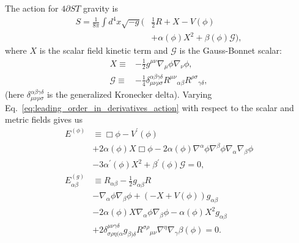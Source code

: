 \documentclass[%
notitlepage,
report,
nofootinbib,
 amsmath,amssymb,
 aps,
]{revtex4-1}
\begin{document}
The action for $4\partial ST$ gravity is
\begin{align}
\label{eq:leading_order_in_derivatives_action}
    S
    =
    \frac{1}{8\pi}
   \int d^4x\sqrt{-g}
   \Big(&
   \frac{1}{2}R
   +
   X
   -
   V\left(\phi\right)
   \nonumber\\
   &
   +
   \alpha\left(\phi\right)X^2
   +	
   \beta\left(\phi\right)\mathcal{G}
   \Big)
    ,
\end{align}
where $X$ is the scalar field kinetic term
and $\mathcal{G}$ is the Gauss-Bonnet scalar:
\begin{subequations}
\begin{align}
   X
   \equiv&
   -
   \frac{1}{2}g^{\mu\nu}\nabla_{\mu}\phi\nabla_{\nu}\phi
   ,\\
   \mathcal{G}
   \equiv&
   -
   \frac{1}{4}
   \delta^{\alpha\beta\gamma\delta}_{\mu\nu\rho\sigma}
   R^{\mu\nu}{}_{\alpha\beta}
   R^{\rho\sigma}{}_{\gamma\delta}
   ,
\end{align}
\end{subequations}
(here $\delta^{\alpha\beta\gamma\delta}_{\mu\nu\rho\sigma}$
is the generalized Kronecker delta).
Varying Eq.~\eqref{eq:leading_order_in_derivatives_action}
with respect to the scalar and metric fields gives us
\begin{align}
\label{eq:eom_edgb_scalar}
   E^{(\phi)}
   &\equiv
   \Box\phi
   -  
   V^{\prime}\left(\phi\right)
   \nonumber\\&
   +  
   2\alpha\left(\phi\right)X \Box\phi
   -  
   2\alpha\left(\phi\right)
   \nabla^{\alpha}\phi\nabla^{\beta}\phi\nabla_{\alpha}\nabla_{\beta}\phi
   \nonumber\\&
   -  
   3\alpha^{\prime}\left(\phi\right)X^2
   +  
   \beta^{\prime}\left(\phi\right)\mathcal{G}
   =
   0
   ,\\
\label{eq:eom_edgb_tensor}
   E^{(g)}_{\alpha\beta}
   &\equiv
   R_{\alpha\beta}
   -  
   \frac{1}{2}g_{\alpha\beta}R
   \nonumber\\&
   -  
   \nabla_{\alpha}\phi\nabla_{\beta}\phi
   +  
   \left(-X+V\left(\phi\right)\right)g_{\alpha\beta}
   \nonumber\\&
   -  
   2\alpha\left(\phi\right)X\nabla_{\alpha}\phi\nabla_{\beta}\phi
   -  
   \alpha\left(\phi\right)X^2g_{\alpha\beta}
   \nonumber\\&
   +  
   2\delta^{\mu\nu\gamma\delta}_{\sigma\rho\eta(\alpha}
   g_{\beta)\delta}R^{\sigma\rho}{}_{\mu\nu}
   \nabla^{\eta}\nabla_{\gamma}\beta\left(\phi\right) 
   =
   0
   .
\end{align}
\end{document}
